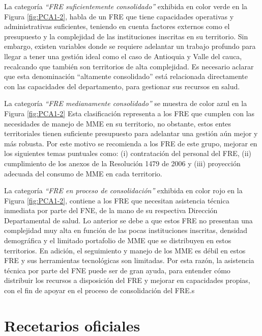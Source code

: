 \documentclass[
]{book}
\begin{document}
La categoría \emph{``FRE suficientemente consolidado''} exhibida en color verde en la Figura \ref{fig:PCA1-2}, habla de un FRE que tiene capacidades operativas y administrativas suficientes, teniendo en cuenta factores externos como el presupuesto y la complejidad de las instituciones inscritas en su territorio. Sin embargo, existen variables donde se requiere adelantar un trabajo profundo para llegar a tener una gestión ideal como el caso de Antioquia y Valle del cauca, recalcando que también son territorios de alta complejidad. Es necesario aclarar que esta denominación ``altamente consolidado'' está relacionada directamente con las capacidades del departamento, para gestionar sus recursos en salud.

La categoría \emph{``FRE medianamente consolidado''} se muestra de color azul en la Figura \ref{fig:PCA1-2} Esta clasificación representa a los FRE que cumplen con las necesidades de manejo de MME en su territorio, no obstante, estos entes territoriales tienen suficiente presupuesto para adelantar una gestión aún mejor y más robusta. Por este motivo se recomienda a los FRE de este grupo, mejorar en los siguientes temas puntuales como: (i) contratación del personal del FRE, (ii) cumplimiento de los anexos de la Resolución 1479 de 2006 y (iii) proyección adecuada del consumo de MME en cada territorio.

La categoría \emph{``FRE en proceso de consolidación''} exhibida en color rojo en la Figura \ref{fig:PCA1-2}, contiene a los FRE que necesitan asistencia técnica inmediata por parte del FNE, de la mano de su respectiva Dirección Departamental de salud. Lo anterior se debe a que estos FRE no presentan una complejidad muy alta en función de las pocas instituciones inscritas, densidad demográfica y el limitado portafolio de MME que se distribuyen en estos territorios.
En adición, el seguimiento y manejo de los MME es débil en estos FRE y sus herramientas tecnológicas son limitadas. Por esta razón, la asistencia técnica por parte del FNE puede ser de gran ayuda, para entender cómo distribuir los recursos a disposición del FRE y mejorar en capacidades propias, con el fin de apoyar en el proceso de consolidación del FRE.s

\hypertarget{recetarios-oficiales}{%
\chapter{Recetarios oficiales}\label{recetarios-oficiales}}

\end{document}

